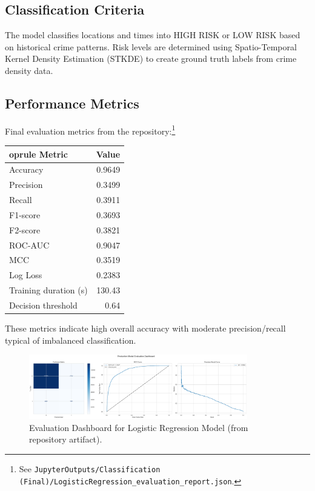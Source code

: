 \documentclass{article}
\begin{document}
\subsection{Classification Criteria}
The model classifies locations and times into HIGH RISK or LOW RISK based on historical crime patterns. Risk levels are determined using Spatio-Temporal Kernel Density Estimation (STKDE) to create ground truth labels from crime density data.

\subsection{Performance Metrics}
Final evaluation metrics from the repository:\footnote{See \texttt{JupyterOutputs/Classification (Final)/LogisticRegression\_evaluation\_report.json}.}
\begin{center}
\begin{tabular}{l r}
	oprule
Metric & Value \\
\midrule
Accuracy & 0.9649 \\
Precision & 0.3499 \\
Recall & 0.3911 \\
F1-score & 0.3693 \\
F2-score & 0.3821 \\
ROC-AUC & 0.9047 \\
MCC & 0.3519 \\
Log Loss & 0.2383 \\
Training duration (s) & 130.43 \\
Decision threshold & 0.64 \\
\bottomrule
\end{tabular}
\end{center}

These metrics indicate high overall accuracy with moderate precision/recall typical of imbalanced classification.

\begin{figure}[H]
\centering
\includegraphics[width=0.85\textwidth]{LogisticRegression_evaluation_dashboard.png}
\caption{Evaluation Dashboard for Logistic Regression Model (from repository artifact).}
\end{figure}
\end{document}
